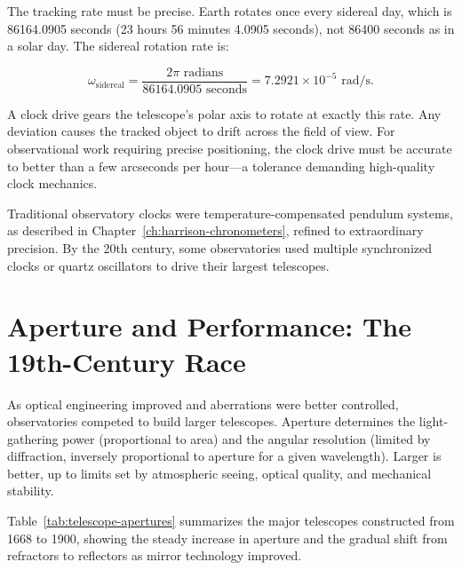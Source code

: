 The tracking rate must be precise. Earth rotates once every sidereal day, which is 86164.0905 seconds (23 hours 56 minutes 4.0905 seconds), not 86400 seconds as in a solar day. The sidereal rotation rate is:

\[
  \omega_{\text{sidereal}} = \frac{2\pi \text{ radians}}{86164.0905 \text{ seconds}} = 7.2921 \times 10^{-5} \text{ rad/s}.
\]

A clock drive gears the telescope's polar axis to rotate at exactly this rate. Any deviation causes the tracked object to drift across the field of view. For observational work requiring precise positioning, the clock drive must be accurate to better than a few arcseconds per hour—a tolerance demanding high-quality clock mechanics.

Traditional observatory clocks were temperature-compensated pendulum systems, as described in Chapter~\ref{ch:harrison-chronometers}, refined to extraordinary precision. By the 20th century, some observatories used multiple synchronized clocks or quartz oscillators to drive their largest telescopes.

\section{Aperture and Performance: The 19th-Century Race}

As optical engineering improved and aberrations were better controlled, observatories competed to build larger telescopes. Aperture determines the light-gathering power (proportional to area) and the angular resolution (limited by diffraction, inversely proportional to aperture for a given wavelength). Larger is better, up to limits set by atmospheric seeing, optical quality, and mechanical stability.

Table~\ref{tab:telescope-apertures} summarizes the major telescopes constructed from 1668 to 1900, showing the steady increase in aperture and the gradual shift from refractors to reflectors as mirror technology improved.

